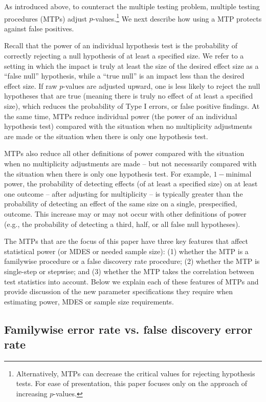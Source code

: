\documentclass[
]{article}
\begin{document}
As introduced above, to counteract the multiple testing problem,
multiple testing procedures (MTPs) adjust
\(p\)-values.\footnote{Alternatively, MTPs can decrease the critical values for rejecting hypothesis tests. For ease of presentation, this paper focuses only on the approach of increasing $p$-values.}
We next describe how using a MTP protects against false positives.

Recall that the power of an individual hypothesis test is the
probability of correctly rejecting a null hypothesis of at least a
specified size. We refer to a setting in which the impact is truly at
least the size of the desired effect size as a ``false null''
hypothesis, while a ``true null'' is an impact less than the desired
effect size. If raw \(p\)-values are adjusted upward, one is less likely
to reject the null hypotheses that are true (meaning there is truly no
effect of at least a specified size), which reduces the probability of
Type I errors, or false positive findings. At the same time, MTPs reduce
individual power (the power of an individual hypothesis test) compared
with the situation when no multiplicity adjustments are made or the
situation when there is only one hypothesis test.

MTPs also reduce all other definitions of power compared with the
situation when no multiplicity adjustments are made -- but not
necessarily compared with the situation when there is only one
hypothesis test. For example, \(1-\)minimal power, the probability of
detecting effects (of at least a specified size) on at least one outcome
-- after adjusting for multiplicity -- is typically greater than the
probability of detecting an effect of the same size on a single,
prespecified, outcome. This increase may or may not occur with other
definitions of power (e.g., the probability of detecting a third, half,
or all false null hypotheses).

The MTPs that are the focus of this paper have three key features that
affect statistical power (or MDES or needed sample size): (1) whether
the MTP is a familywise procedure or a false discovery rate procedure;
(2) whether the MTP is single-step or stepwise; and (3) whether the MTP
takes the correlation between test statistics into account. Below we
explain each of these features of MTPs and provide discussion of the new
parameter specifications they require when estimating power, MDES or
sample size requirements.

\subsection{Familywise error rate vs. false discovery error rate}
\end{document}
